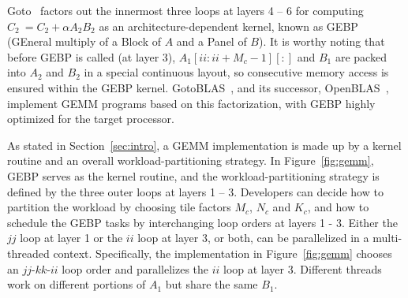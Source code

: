 Goto~\cite{gotogemm} factors out the innermost three loops at layers 4 -- 6 for
computing $C_2\ = C_2 + \alpha A_2 B_2$ as an architecture-dependent kernel,
known as  GEBP (GEneral multiply of a Block of $A$ and a Panel of $B$).
It is worthy noting that before GEBP is called (at layer 3),
$A_1[ii:ii+M_c-1][:]$ and $B_1$ are packed into $A_2$ and $B_2$
in a special continuous layout,
so consecutive memory access is ensured within the GEBP kernel.
GotoBLAS~\cite{gotoblas}, and its successor, OpenBLAS~\cite{openblas},
implement GEMM programs based on this factorization,
with GEBP highly optimized for the target processor.

As stated in Section~\ref{sec:intro}, a GEMM implementation
is made up by a kernel routine and an overall workload-partitioning strategy.
In Figure~\ref{fig:gemm}, GEBP serves as the kernel routine,
and the workload-partitioning strategy is defined by the three outer loops at layers 1 -- 3.
Developers can decide how to partition the workload by choosing
tile factors $M_c$, $N_c$ and $K_c$,
and how to schedule the GEBP tasks by interchanging loop orders at layers 1 - 3.
Either the $jj$ loop at layer 1 or the $ii$ loop at layer 3, or both,
can be parallelized in a multi-threaded context.
Specifically, the implementation in Figure~\ref{fig:gemm}
chooses an $jj\textrm{-}kk\textrm{-}ii$ loop order
and parallelizes the $ii$ loop at layer 3.
Different threads work on different portions of $A_1$
but share the same $B_1$.

